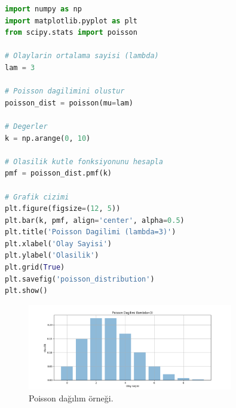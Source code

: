\begin{lstlisting}[language=Python]
import numpy as np
import matplotlib.pyplot as plt
from scipy.stats import poisson

# Olaylarin ortalama sayisi (lambda)
lam = 3

# Poisson dagilimini olustur
poisson_dist = poisson(mu=lam)

# Degerler
k = np.arange(0, 10)

# Olasilik kutle fonksiyonunu hesapla
pmf = poisson_dist.pmf(k)

# Grafik cizimi
plt.figure(figsize=(12, 5))
plt.bar(k, pmf, align='center', alpha=0.5)
plt.title('Poisson Dagilimi (lambda=3)')
plt.xlabel('Olay Sayisi')
plt.ylabel('Olasilik')
plt.grid(True)
plt.savefig('poisson_distribution')
plt.show()
\end{lstlisting}

\begin{figure}[h]
    \centering
    \includegraphics[width=0.8\textwidth]{images/poisson_distribution.png}
    \caption{Poisson dağılım örneği.}
    \label{fig:enter-label}
\end{figure}

\newpage 